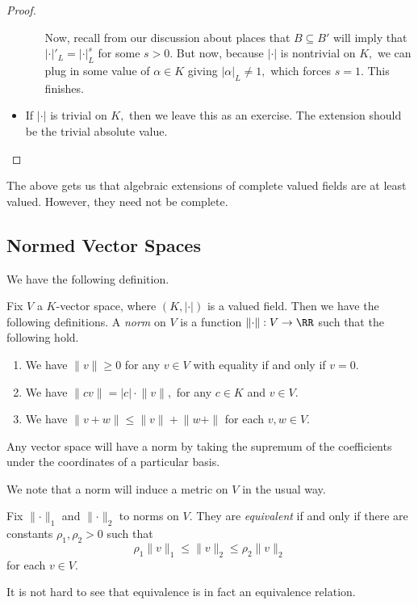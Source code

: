 \begin{proof}
\begin{itemize}
\begin{enumerate}[label=(\alph*)]
			Now, recall from our discussion about places that $B\subseteq B'$ will imply that $|\cdot|'_L=|\cdot|^s_L$ for some $s>0.$ But now, because $|\cdot|$ is nontrivial on $K,$ we can plug in some value of $\alpha\in K$ giving $|\alpha|_L\ne1,$ which forces $s=1.$ This finishes.
		\end{enumerate}
		\item If $|\cdot|$ is trivial on $K,$ then we leave this as an exercise. The extension should be the trivial absolute value.
		\qedhere
	\end{itemize}
\end{proof}
The above gets us that algebraic extensions of complete valued fields are at least valued. However, they need not be complete.

\subsection{Normed Vector Spaces}
We have the following definition.
\begin{definition}
	Fix $V$ a $K$-vector space, where $(K,|\cdot|)$ is a valued field. Then we have the following definitions. A \textit{norm} on $V$ is a function $\lVert\cdot\rVert:V\to\RR$ such that the following hold.
	\begin{enumerate}[label=(\roman*)]
		\item We have $\lVert v\rVert\ge0$ for any $v\in V$ with equality if and only if $v=0.$
		\item We have $\lVert cv\rVert=|c|\cdot\lVert v\rVert,$ for any $c\in K$ and $v\in V.$
		\item We have $\lVert v+w\rVert\le\lVert v\rVert+\lVert w+\rVert$ for each $v,w\in V.$
	\end{enumerate}
\end{definition}
\begin{example}
	Any vector space will have a norm by taking the supremum of the coefficients under the coordinates of a particular basis.
\end{example}
We note that a norm will induce a metric on $V$ in the usual way.
\begin{definition}
	Fix $\lVert\cdot\rVert_1$ and $\lVert\cdot\rVert_2$ to norms on $V.$ They are \textit{equivalent} if and only if there are constants $\rho_1,\rho_2>0$ such that
	\[\rho_1\lVert v\rVert_1\le\lVert v\rVert_2\le\rho_2\lVert v\rVert_2\]
	for each $v\in V.$
\end{definition}
It is not hard to see that equivalence is in fact an equivalence relation.

